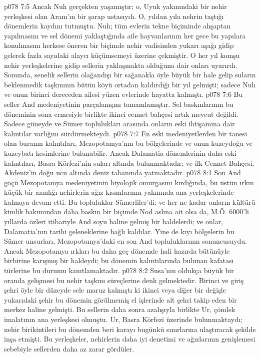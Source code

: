 \vs p078 7:5 Ancak Nuh gerçekten yaşamıştır; o, Uyuk yakınındaki bir nehir yerleşkesi olan Aram’ın bir şarap ustasıydı. O, yıldan yıla nehrin taştığı dönemlerin kaydını tutmuştu. Nuh; tüm evlerin tekne biçiminde ahşaptan yapılmasını ve sel dönemi yaklaştığında aile hayvanlarının her gece bu yapılara konulmasını herkese öneren bir biçimde nehir vadisinden yukarı aşağı gidip gelerek fazla sayıdaki alaycı küçümsemeyi üzerine çekmiştir. O her yıl komşu nehir yerleşkelerine gidip sellerin yaklaşmakta olduğuna dair onları uyarırdı. Sonunda, senelik sellerin olağandışı bir sağanakla öyle büyük bir hale gelip suların beklenmedik taşkınının bütün köyü ortadan kaldırdığı bir yıl gelmişti; sadece Nuh ve onun birinci dereceden ailesi yüzen evlerinde hayatta kalmıştı.
\vs p078 7:6 Bu seller And medeniyetinin parçalanışını tamamlamıştır. Sel baskınlarının bu döneminin sona ermesiyle birlikte ikinci cennet bahçesi artık mevcut değildi. Sadece güneyde ve Sümer toplulukları arasında onların eski ihtişamına dair kalıntılar varlığını sürdürmekteydi.
\vs p078 7:7 En eski medeniyetlerden bir tanesi olan buranın kalıntıları, Mezopotamya’nın bu bölgelerinde ve onun kuzeydoğu ve kuzeybatı kesimlerine bulunabilir. Ancak Dalamatia dönemlerinin daha eski kalıntıları, Basra Körfezi’nin suları altında bulunmaktadır; ve ilk Cennet Bahçesi, Akdeniz’in doğu ucu altında deniz tabanında yatmaktadır.
\vs p078 8:1 Son And göçü Mezopotamya medeniyetinin biyolojik omurgasını kırdığında, bu üstün ırkın küçük bir azınlığı nehirlerin ağız kısımlarının yakınında ana yerleşkelerinde kalmaya devam etti. Bu topluluklar Sümerliler’di; ve her ne kadar onların kültürü kimlik bakımından daha baskın bir biçimde Nod aslına ait olsa da, M.Ö. 6000’li yıllarda özleri itibariyle And soyu haline gelmiş bir haldelerdi; ve onlar, Dalamatia’nın tarihi geleneklerine bağlı kaldılar. Yine de kıyı bölgelerin bu Sümer unsurları, Mezopotamya’daki en son And topluluklarının sonuncusuydu. Ancak Mezopotamya ırkları bu daha geç dönemde hali hazırda bütünüyle birbirine karışmış bir haldeydi; bu dönemin kalıntılarında bulunan kafatası türlerine bu durumu kanıtlamaktadır.
\vs p078 8:2 Susa’nın oldukça büyük bir oranda gelişmesi bu nehir taşkını süreçlerine denk gelmektedir. Birinci ve giriş şehri öyle bir düzeyde sele maruz kalmıştı ki ikinci veya diğer bir değişle yukarıdaki şehir bu dönemin görülmemiş el işlerinde alt şehri takip eden bir merkez haline gelmişti. Bu sellerin daha sonra azalışıyla birlikte Ur, çömlek imalatının ana yerleşkesi olmuştu. Ur, Basra Körfezi üzerinde bulunmaktaydı; nehir birikintileri bu dönemden beri karayı bugünkü sınırlarına ulaştıracak şekilde inşa etmişti. Bu yerleşkeler, nehirlerin daha iyi denetimi ve ağızlarının genişlemesi sebebiyle sellerden daha az zarar gördüler.
